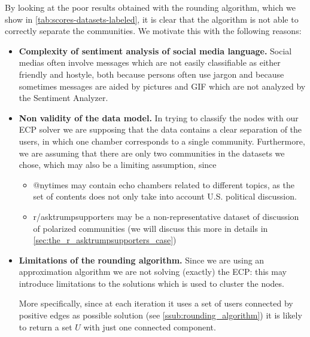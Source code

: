 By looking at the poor results obtained with the rounding algorithm, which we show in
\autoref{tab:scores-datasets-labeled}, it is clear that the algorithm is not
able to correctly separate the communities. We motivate this with the following
reasons:
\begin{itemize}
	\item \textbf{Complexity of sentiment analysis of social media language.}
	      Social medias often involve messages which are not easily classifiable
	      as either friendly and hostyle, both because persons often use jargon
	      and because sometimes messages are aided by pictures and GIF which
	      are not analyzed by the Sentiment Analyzer.
	\item \textbf{Non validity of the data model.} In trying to classify the
	      nodes with our \acrshort{ECP} solver we are supposing that the data
	      contains a clear separation of the users, in which one chamber
	      corresponds to a single community. Furthermore, we are assuming that
	      there are only two communities in the datasets we chose, which may also
	      be a limiting assumption, since
	      \begin{itemize}
		      \item @nytimes may contain echo chambers related to different
		            topics, as the set of contents does not only take into account
		            U.S. political discussion.
		      \item r/asktrumpsupporters may be a non-representative
		            dataset of discussion of polarized communities (we will
		            discuss this more in details in
		            \autoref{sec:the_r_asktrumpsupporters_case})
	      \end{itemize}
	\item \textbf{Limitations of the rounding algorithm.} Since we are
	      using an approximation algorithm we are not solving (exactly) the
	      \acrshort{ECP}: this may introduce limitations to the solutions which
	      is used to cluster the nodes.

	      More specifically, since at each iteration it uses a set of users
	      connected by positive edges as possible solution (see
	      \autoref{ssub:rounding_algorithm}) it is likely to return
	      a set $U$ with just one connected component.

\end{itemize}

